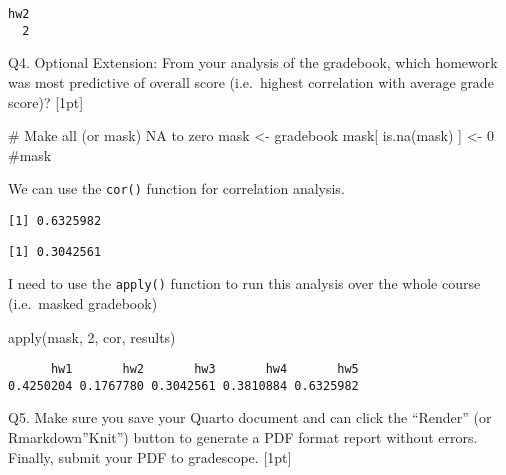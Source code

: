 \documentclass[
  letterpaper,
  DIV=11,
  numbers=noendperiod]{scrartcl}
\newenvironment{Shaded}{\begin{snugshade}}{\end{snugshade}}
\newcommand{\CommentTok}[1]{\textcolor[rgb]{0.37,0.37,0.37}{#1}}
\newcommand{\DecValTok}[1]{\textcolor[rgb]{0.68,0.00,0.00}{#1}}
\newcommand{\FunctionTok}[1]{\textcolor[rgb]{0.28,0.35,0.67}{#1}}
\newcommand{\NormalTok}[1]{\textcolor[rgb]{0.00,0.23,0.31}{#1}}
\newcommand{\OtherTok}[1]{\textcolor[rgb]{0.00,0.23,0.31}{#1}}
\newcommand{\SpecialCharTok}[1]{\textcolor[rgb]{0.37,0.37,0.37}{#1}}
\begin{document}
\begin{verbatim}
hw2 
  2 
\end{verbatim}

Q4. Optional Extension: From your analysis of the gradebook, which
homework was most predictive of overall score (i.e.~highest correlation
with average grade score)? {[}1pt{]}

\begin{Shaded}
\begin{Highlighting}[]
\CommentTok{\# Make all (or mask) NA to zero}
\NormalTok{mask }\OtherTok{\textless{}{-}}\NormalTok{ gradebook}
\NormalTok{mask[ }\FunctionTok{is.na}\NormalTok{(mask) ] }\OtherTok{\textless{}{-}} \DecValTok{0}
\CommentTok{\#mask}
\end{Highlighting}
\end{Shaded}

We can use the \texttt{cor()} function for correlation analysis.

\begin{Shaded}
\end{Shaded}

\begin{verbatim}
[1] 0.6325982
\end{verbatim}

\begin{Shaded}
\end{Shaded}

\begin{verbatim}
[1] 0.3042561
\end{verbatim}

I need to use the \texttt{apply()} function to run this analysis over
the whole course (i.e.~masked gradebook)

\begin{Shaded}
\begin{Highlighting}[]
\FunctionTok{apply}\NormalTok{(mask, }\DecValTok{2}\NormalTok{, cor, results)}
\end{Highlighting}
\end{Shaded}

\begin{verbatim}
      hw1       hw2       hw3       hw4       hw5 
0.4250204 0.1767780 0.3042561 0.3810884 0.6325982 
\end{verbatim}

Q5. Make sure you save your Quarto document and can click the ``Render''
(or Rmarkdown''Knit'') button to generate a PDF format report without
errors. Finally, submit your PDF to gradescope. {[}1pt{]}
\end{document}
